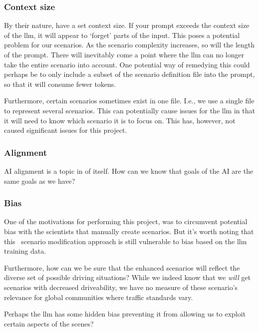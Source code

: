 \subsubsection{Context size}

By their nature,  have a set context size. If your prompt exceeds the context size
of the \acrshort{llm}, it will appear to `forget' parts of the input. This poses a potential problem
for our scenarios. As the scenario complexity increases, so will the length of the prompt. There
will inevitably come a point where the \acrshort{llm} can no longer take the entire scenario into
account. One potential way of remedying this could perhaps be to only include a subset of the
scenario definition file into the prompt, so that it will consume fewer tokens.

Furthermore, certain scenarios sometimes exist in one file. I.e., we use a single file to represent
several scenarios. This can potentially cause issues for the \acrshort{llm} in that it will need to
know which scenario it is to focus on. This has, however, not caused significant issues for this project.

\subsubsection{Alignment}

AI alignment is a topic in of itself. How can we know that goals of the AI are the same goals as we
have?

\subsubsection{Bias}

One of the motivations for performing this project, was to circumvent potential bias with the
scientists that manually create scenarios. But it's worth noting that this \hefe~scenario
modification approach is still vulnerable to bias based on the \acrshort{llm} training data.

Furthermore, how can we be sure that the enhanced scenarios will reflect the diverse set of possible
driving situations? While we indeed know that we \emph{will} get scenarios with decreased
driveability, we have no measure of these scenario's relevance for global communities where traffic
standards vary.

Perhaps the \acrshort{llm} has some hidden bias preventing it from allowing us to exploit certain
aspects of the scenes?

